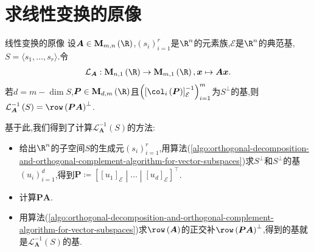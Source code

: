 \section{求线性变换的原像}

\begin{theorem}{线性变换的原像}{}
	设$\boldsymbol{A}\in\mathbf{M}_{m,n}\left(\R\right)$,$\left(s_{i}\right)_{i=1}^{r}$是$\R^{n}$的元素族,$\mathcal{E}$是$\R^{n}$的典范基,$S=\langle s_{1},\ldots,s_{r}\rangle$.令
	\begin{align*}
		\mathcal{L}_{\boldsymbol{A}}:\mathbf{M}_{n,1}\left(\R\right)\to\mathbf{M}_{m,1}\left(\R\right),\boldsymbol{x}\mapsto\boldsymbol{A}\boldsymbol{x}.
	\end{align*}
	若$d=m-\dim S$,$\boldsymbol{P}\in\mathbf{M}_{d,m}\left(\R\right)$且$\left(\left[\col_{i}\left(\boldsymbol{P}\right)\right]_{\mathcal{E}}^{-1}\right)_{i=1}^{m}$为$S^{\perp}$的基,则$\mathcal{L}_{\boldsymbol{A}}^{-1}\left(S\right)=\row\left(\boldsymbol{P}\boldsymbol{A}\right)^{\perp}$.
\end{theorem}

基于此,我们得到了计算$\mathcal{L}_{\boldsymbol{A}}^{-1}\left(S\right)$的方法:
\begin{itemize}
	\item 给出$\R^{n}$的子空间$S$的生成元$\left(s_{i}\right)_{i=1}^{r}$,用算法(\ref{algo:orthogonal-decomposition-and-orthogonal-complement-algorithm-for-vector-subspaces})求$S^{\perp}$和$S^{\perp}$的基$\left(u_{i}\right)_{i=1}^{d}$,得到$\boldsymbol{P}\coloneq\left[\left[u_{1}\right]_{\mathcal{E}}\middle|\ldots\middle|\left[u_{d}\right]_{\mathcal{E}}\right]^{\top}$.
	\item 计算$\boldsymbol{P}\boldsymbol{A}$.
	\item 用算法(\ref{algo:orthogonal-decomposition-and-orthogonal-complement-algorithm-for-vector-subspaces})求$\row\left(\boldsymbol{A}\right)$的正交补$\row\left(\boldsymbol{P}\boldsymbol{A}\right)^{\perp}$,得到的基就是$\mathcal{L}_{\boldsymbol{A}}^{-1}\left(S\right)$的基.
\end{itemize}











